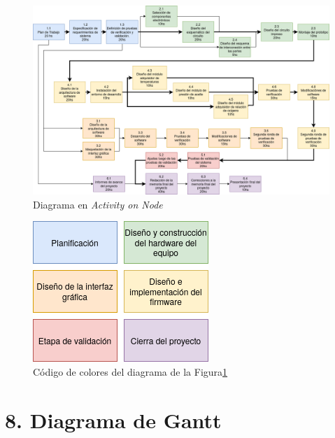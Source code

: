 \documentclass[11pt]{charter}
\begin{document}
\begin{figure}[htpb]
\centering 
\includegraphics[angle=90, width=.9\textwidth]{./Figuras/activity-on-node.png}
\caption{Diagrama en \textit{Activity on Node}}
\label{fig:AoN}
\end{figure}

\begin{figure}[htpb]
\centering 
\includegraphics[width=.3\textwidth]{./Figuras/leyenda.png}
\caption{Código de colores del diagrama de la Figura\ref{fig:AoN}}
\label{fig:leyenda-aon}
\end{figure}


\section{8. Diagrama de Gantt}
\label{sec:gantt}
\end{document}
